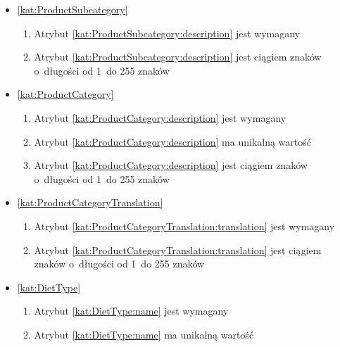 \begin{itemize}[label={\textbf{Ograniczenia dla}}, wide, labelwidth=!, labelindent=0pt]
    \item\ref{kat:ProductSubcategory}
    \begin{enumerate}[label={\textbf{OGR/\protect\threedigits{\arabic{enumi}}}}, wide, labelwidth=!, align=left, leftmargin=3cm, resume]
        \item Atrybut \ref{kat:ProductSubcategory:description} jest wymagany

        \item Atrybut \ref{kat:ProductSubcategory:description} jest ciągiem znaków o~długości od 1~do 255 znaków
    \end{enumerate}

    \item\ref{kat:ProductCategory}
    \begin{enumerate}[label={\textbf{OGR/\protect\threedigits{\arabic{enumi}}}}, wide, labelwidth=!, align=left, leftmargin=3cm, resume]
        \item Atrybut \ref{kat:ProductCategory:description} jest wymagany

        \item Atrybut \ref{kat:ProductCategory:description} ma unikalną wartość

        \item Atrybut \ref{kat:ProductCategory:description} jest ciągiem znaków o~długości od 1~do 255 znaków
    \end{enumerate}

    \item\ref{kat:ProductCategoryTranslation}
    \begin{enumerate}[label={\textbf{OGR/\protect\threedigits{\arabic{enumi}}}}, wide, labelwidth=!, align=left, leftmargin=3cm, resume]
        \item Atrybut \ref{kat:ProductCategoryTranslation:translation} jest wymagany

        \item Atrybut \ref{kat:ProductCategoryTranslation:translation} jest ciągiem znaków o~długości od 1~do 255 znaków
    \end{enumerate}

    \item\ref{kat:DietType}
    \begin{enumerate}[label={\textbf{OGR/\protect\threedigits{\arabic{enumi}}}}, wide, labelwidth=!, align=left, leftmargin=3cm, resume]
        \item Atrybut \ref{kat:DietType:name} jest wymagany

        \item Atrybut \ref{kat:DietType:name} ma unikalną wartość


\end{enumerate}
\end{itemize}
